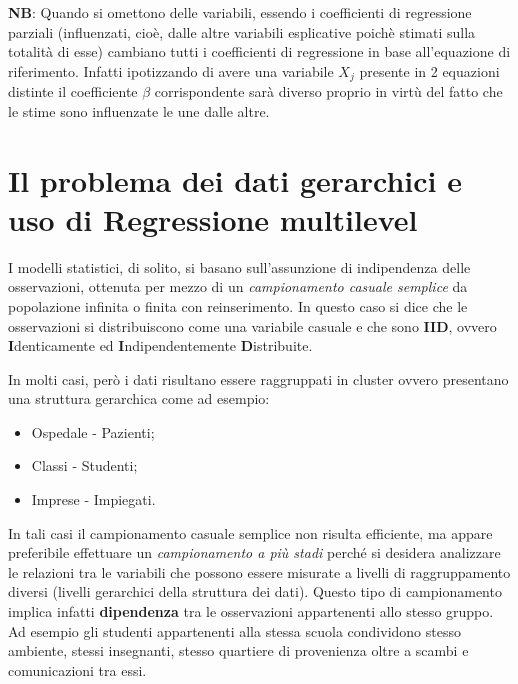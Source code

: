 \documentclass[a4page, 11pt]{article} %
\begin{document}
\newline
\newline
\textbf{NB}: Quando si omettono delle variabili, essendo i coefficienti di regressione parziali (influenzati, cioè, dalle altre variabili esplicative poichè stimati sulla totalità di esse) cambiano tutti i coefficienti di regressione in base all'equazione di riferimento. Infatti ipotizzando di avere una variabile $X_j$ presente in 2 equazioni distinte il coefficiente $\beta$ corrispondente sarà diverso proprio in virtù del fatto che le stime sono influenzate le une dalle altre.

\section{Il problema dei dati gerarchici e uso di Regressione multilevel}

I modelli statistici, di solito, si basano sull'assunzione di indipendenza delle osservazioni, ottenuta per mezzo di un \textit{campionamento casuale semplice} da popolazione infinita o finita con reinserimento. In questo caso si dice che le osservazioni si distribuiscono come una variabile casuale e che sono \textbf{IID}, ovvero \textbf{I}denticamente ed \textbf{I}ndipendentemente \textbf{D}istribuite.
 
In molti casi, però i dati risultano essere raggruppati in cluster ovvero presentano una struttura gerarchica come ad esempio:
\begin{itemize}
\item  Ospedale - Pazienti;
\item  Classi - Studenti;
\item Imprese - Impiegati.
\end{itemize}
 In tali casi il campionamento casuale semplice non risulta efficiente, ma appare preferibile effettuare un \textit{campionamento a più stadi} perché si desidera analizzare le relazioni tra le variabili che possono essere misurate a livelli di raggruppamento diversi (livelli gerarchici della struttura dei dati). Questo tipo di campionamento implica infatti \textbf{dipendenza} tra le osservazioni appartenenti allo stesso gruppo. Ad esempio gli studenti appartenenti alla stessa scuola condividono stesso ambiente, stessi insegnanti, stesso quartiere di provenienza oltre a scambi e comunicazioni tra essi.
\end{document}

